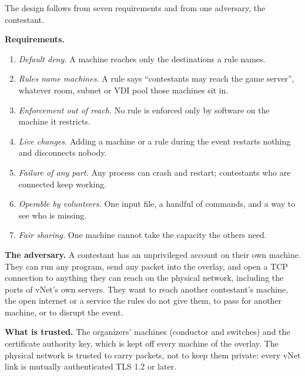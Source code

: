 \documentclass[11pt,a4paper]{article}
\providecommand{\tightlist}{\setlength{\itemsep}{0pt}\setlength{\parskip}{0pt}}
\begin{document}
The design follows from seven requirements and from one adversary, the contestant.

\textbf{Requirements.}

\begin{enumerate}
\def\labelenumi{\arabic{enumi}.}
\tightlist
\item
  \emph{Default deny.} A machine reaches only the destinations a rule names.
\item
  \emph{Rules name machines.} A rule says ``contestants may reach the game server'', whatever room, subnet or VDI pool those machines sit in.
\item
  \emph{Enforcement out of reach.} No rule is enforced only by software on the machine it restricts.
\item
  \emph{Live changes.} Adding a machine or a rule during the event restarts nothing and disconnects nobody.
\item
  \emph{Failure of any part.} Any process can crash and restart; contestants who are connected keep working.
\item
  \emph{Operable by volunteers.} One input file, a handful of commands, and a way to see who is missing.
\item
  \emph{Fair sharing.} One machine cannot take the capacity the others need.
\end{enumerate}

\textbf{The adversary.} A contestant has an unprivileged account on their own machine. They can run any program, send any packet into the overlay, and open a TCP connection to anything they can reach on the physical network, including the ports of vNet's own servers. They want to reach another contestant's machine, the open internet or a service the rules do not give them, to pass for another machine, or to disrupt the event.

\textbf{What is trusted.} The organizers' machines (conductor and switches) and the certificate authority key, which is kept off every machine of the overlay. The physical network is trusted to carry packets, not to keep them private: every vNet link is mutually authenticated TLS 1.2 or later.
\end{document}
